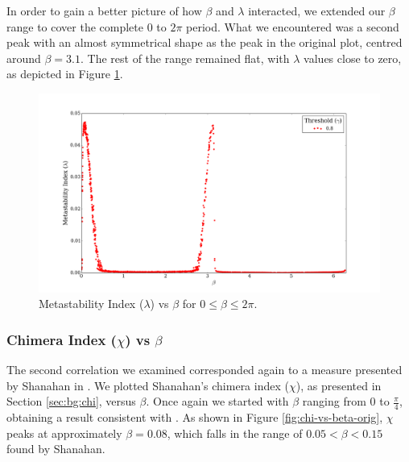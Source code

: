 \documentclass[a4paper,11pt]{article}
\begin{document}
In order to gain a better picture of how $\beta$ and $\lambda$ interacted, we extended our $\beta$ range to cover the complete $0$ to $2\pi$ period. What we encountered was a second peak with an almost symmetrical shape as the peak in the original plot, centred around $\beta = 3.1$. The rest of the range remained flat, with $\lambda$ values close to zero, as depicted in Figure \ref{fig:lambda-vs-beta-ext}.

\begin{figure}[H]
\begin{center}
\includegraphics[scale = 0.35]{figures/lambda_vs_beta_ext}
\end{center}
\caption{
	Metastability Index ($\lambda$) vs $\beta$ for $0 \leq \beta \leq 2\pi$.
	\label{fig:lambda-vs-beta-ext}
}
\end{figure}

\subsubsection{Chimera Index ($\chi$) vs $\beta$}
\label{sec:app:osc:res:chi-v-beta}

The second correlation we examined corresponded again to a measure presented by Shanahan in \cite{Shanahan2010}. We plotted Shanahan's chimera index ($\chi$), as presented in Section \ref{sec:bg:chi}, versus $\beta$. Once again we started with $\beta$ ranging from $0$ to $\frac{\pi}{4}$, obtaining a result consistent with \cite{Shanahan2010}. As shown in Figure \ref{fig:chi-vs-beta-orig}, $\chi$ peaks at approximately $\beta = 0.08$, which falls in the range of $0.05 < \beta < 0.15$ found by Shanahan.
\end{document}
